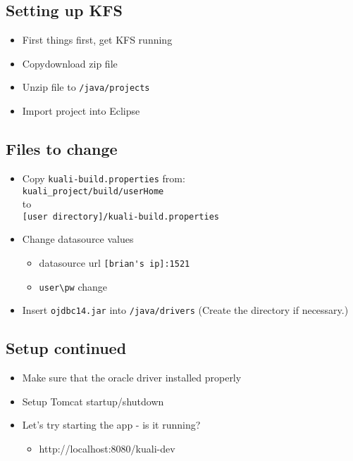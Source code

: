 \begin{ifhtml}
  \begin{s5slide}
    \section{Setting up KFS}
    \begin{itemize}
      \item First things first, get KFS running
      \item Copy\/download zip file
      \item Unzip file to \verb|/java/projects|
      \item Import project into Eclipse
    \end{itemize}
  \end{s5slide}
  \begin{s5slide}
      \section{Files to change}
      \begin{ifhtml}
          \begin{itemize}
            \item Copy \verb|kuali-build.properties| from: \\
                    \verb|kuali_project/build/userHome|  \\
                    to \\
                    \verb|[user directory]/kuali-build.properties| \\
            \item Change datasource values
              \begin{itemize}
                \item datasource url \- \verb|[brian's ip]:1521|
                \item \verb|user\pw| change
              \end{itemize}
            \item Insert \verb|ojdbc14.jar| into \verb|/java/drivers| (Create the directory if necessary.)
          \end{itemize}
      \end{ifhtml} 
  \end{s5slide}
  \begin{s5slide}
    \section{Setup continued}
    \begin{itemize}
      \item Make sure that the oracle driver installed properly
      \item Setup Tomcat startup/shutdown
      \item Let's try starting the app - is it running?
        \begin{itemize}
          \item http://localhost:8080/kuali-dev
        \end{itemize}
    \end{itemize}
  \end{s5slide}
\end{ifhtml}
